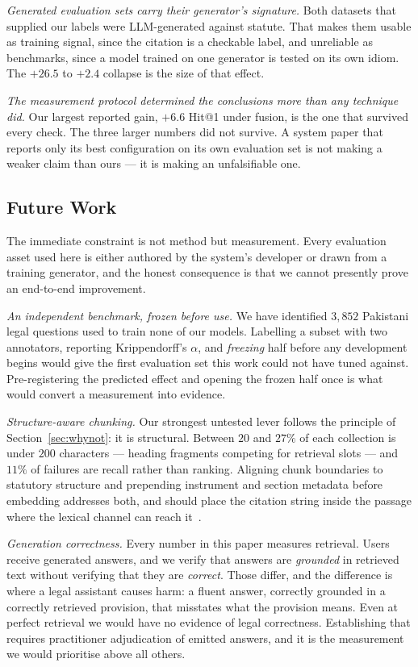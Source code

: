 \documentclass[conference]{IEEEtran}
\begin{document}
\emph{Generated evaluation sets carry their generator's signature.} Both
datasets that supplied our labels were LLM-generated against statute. That makes
them usable as training signal, since the citation is a checkable label, and
unreliable as benchmarks, since a model trained on one generator is tested on its
own idiom. The $+26.5$ to $+2.4$ collapse is the size of that effect.

\emph{The measurement protocol determined the conclusions more than any
technique did.} Our largest reported gain, $+6.6$ Hit@1 under fusion, is the one
that survived every check. The three larger numbers did not survive. A system
paper that reports only its best configuration on its own evaluation set is not
making a weaker claim than ours --- it is making an unfalsifiable one.

\subsection{Future Work}
\label{sec:future}
The immediate constraint is not method but measurement. Every evaluation asset
used here is either authored by the system's developer or drawn from a training
generator, and the honest consequence is that we cannot presently prove an
end-to-end improvement.

\emph{An independent benchmark, frozen before use.} We have identified $3{,}852$
Pakistani legal questions used to train none of our models. Labelling a subset
with two annotators, reporting Krippendorff's $\alpha$, and \emph{freezing} half
before any development begins would give the first evaluation set this work
could not have tuned against. Pre-registering the predicted effect and opening
the frozen half once is what would convert a measurement into evidence.

\emph{Structure-aware chunking.} Our strongest untested lever follows the
principle of Section~\ref{sec:whynot}: it is structural. Between $20$ and $27\%$
of each collection is under $200$ characters --- heading fragments competing for
retrieval slots --- and $11\%$ of failures are recall rather than ranking.
Aligning chunk boundaries to statutory structure and prepending instrument and
section metadata before embedding addresses both, and should place the citation
string inside the passage where the lexical channel can reach
it~\cite{metadatarag2026,reliablelegalrag2025}.

\emph{Generation correctness.} Every number in this paper measures retrieval.
Users receive generated answers, and we verify that answers are \emph{grounded}
in retrieved text without verifying that they are \emph{correct}. Those differ,
and the difference is where a legal assistant causes harm: a fluent answer,
correctly grounded in a correctly retrieved provision, that misstates what the
provision means. Even at perfect retrieval we would have no evidence of legal
correctness. Establishing that requires practitioner adjudication of emitted
answers, and it is the measurement we would prioritise above all others.
\end{document}
